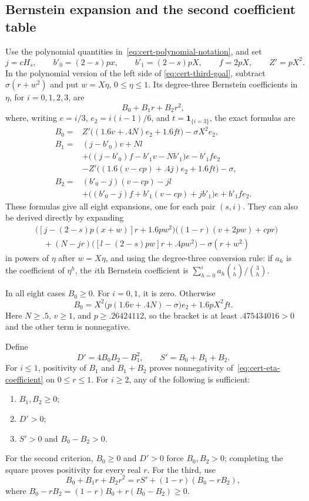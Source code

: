 \subsection{Bernstein expansion and the second coefficient table}

Use the polynomial quantities in~\eqref{eq:cert-polynomial-notation},
and set
\[
 j=cH_s,\qquad b'_0=(2-s)px,\qquad b'_1=(2-s)pX,
 \qquad f=2pX,\qquad Z'=pX^2.
\]
In the polynomial version of the left side of
\eqref{eq:cert-third-goal}, subtract $\sigma(r+w^2)$ and put
$w=X\eta$, $0\le\eta\le1$.  Its degree-three Bernstein
coefficients in $\eta$, for $i=0,1,2,3$, are
\begin{equation}
 B_0+B_1r+B_2r^2,
 \label{eq:cert-eta-coefficient}
\end{equation}
where, writing $e=i/3$, $e_2=i(i-1)/6$, and
$t=\mathbf{1}_{\{i=3\}}$, the exact formulas are
\begin{equation}
\begin{aligned}
 B_0={}&Z'\bigl((1.6v+.4N)e_2+1.6ft\bigr)-\sigma X^2e_2,\\
 B_1={}&(j-b'_0)v+Nl\\
       &+\bigl((j-b'_0)f-b'_1v-Nb'_1\bigr)e-b'_1fe_2\\
       &-Z'\bigl((1.6(v-cp)+.4j)e_2+1.6ft\bigr)-\sigma,\\
 B_2={}&(b'_0-j)(v-cp)-jl\\
       &+\bigl((b'_0-j)f+b'_1(v-cp)+jb'_1\bigr)e+b'_1fe_2.
\end{aligned}
\label{eq:cert-bcoeff}
\end{equation}
These formulas give all eight expansions, one for each pair $(s,i)$.
They can also be derived directly by expanding
\begin{align*}
 &\bigl([j-(2-s)p(x+w)]r+1.6pw^2\bigr)
       \bigl((1-r)(v+2pw)+cpr\bigr)\\
 &\quad +(N-jr)\bigl([l-(2-s)pw]r+.4pw^2\bigr)
       -\sigma(r+w^2)
\end{align*}
in powers of $\eta$ after $w=X\eta$, and using the degree-three
conversion rule: if $a_h$ is the coefficient of $\eta^h$, the
$i$th Bernstein coefficient is
$\sum_{h=0}^i a_h\binom ih/\binom3h$.

In all eight cases $B_0\ge0$.  For $i=0,1$, it is zero.  Otherwise
\[
 B_0=X^2\bigl(p(1.6v+.4N)-\sigma\bigr)e_2+1.6pX^2ft.
\]
Here $N\ge.5$, $v\ge1$, and $p\ge.26424112$, so the bracket is
at least $.475434016>0$ and the other term is nonnegative.

Define
\[
 D'=4B_0B_2-B_1^2,\qquad S'=B_0+B_1+B_2.
\]
For $i\le1$, positivity of $B_1$ and $B_1+B_2$ proves
nonnegativity of~\eqref{eq:cert-eta-coefficient} on $0\le r\le1$.
For $i\ge2$, any of the following is sufficient:
\begin{enumerate}
 \item $B_1,B_2\ge0$;
 \item $D'>0$;
 \item $S'>0$ and $B_0-B_2>0$.
\end{enumerate}
For the second criterion, $B_0\ge0$ and $D'>0$ force
$B_0,B_2>0$; completing the square proves positivity for every
real $r$.  For the third, use
\[
 B_0+B_1r+B_2r^2
   =rS'+(1-r)(B_0-rB_2),
\]
where $B_0-rB_2=(1-r)B_0+r(B_0-B_2)\ge0$.

